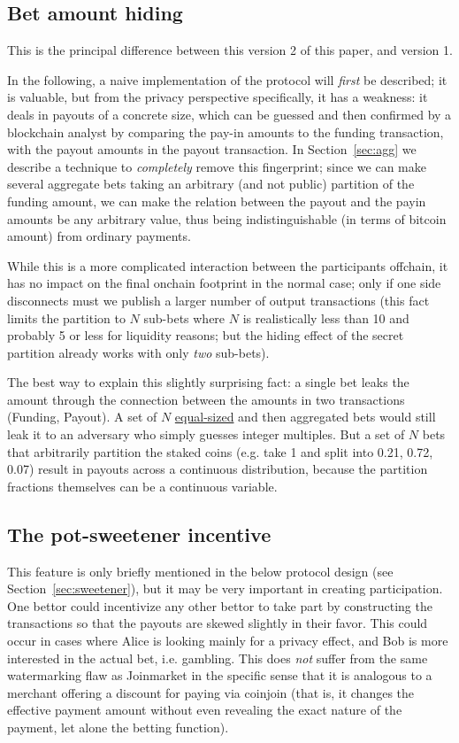 \documentclass[11pt]{article}
\begin{document}
\subsection{Bet amount hiding}
\label{sec:bamhide}

This is the principal difference between this version 2 of this paper, and version 1.

In the following, a naive implementation of the protocol will \emph{first} be described; it is valuable, but from the privacy perspective specifically, it has a weakness: it deals in payouts of a concrete size, which can be guessed and then confirmed by a blockchain analyst by comparing the pay-in amounts to the funding transaction, with the payout amounts in the payout transaction. In Section~\ref{sec:agg} we describe a technique to \emph{completely} remove this fingerprint; since we can make several aggregate bets taking an arbitrary (and not public) partition of the funding amount, we can make the relation between the payout and the payin amounts be any arbitrary value, thus being indistinguishable (in terms of bitcoin amount) from ordinary payments.

While this is a more complicated interaction between the participants offchain, it has no impact on the final onchain footprint in the normal case; only if one side disconnects must we publish a larger number of output transactions (this fact limits the partition to $N$ sub-bets where $N$ is realistically less than 10 and probably 5 or less for liquidity reasons; but the hiding effect of the secret partition already works with only \emph{two} sub-bets).

The best way to explain this slightly surprising fact: a single bet leaks the amount through the connection between the amounts in two transactions (Funding, Payout). A set of $N$ \underline{equal-sized} and then aggregated bets would still leak it to an adversary who simply guesses integer multiples. But a set of $N$ bets that arbitrarily partition the staked coins (e.g. take 1 and split into 0.21, 0.72, 0.07) result in payouts across a continuous distribution, because the partition fractions themselves can be a continuous variable.

\subsection{The pot-sweetener incentive}
\label{sec:potsweet}

This feature is only briefly mentioned in the below protocol design (see Section~\ref{sec:sweetener}), but it may be very important in creating participation. One bettor could incentivize any other bettor to take part by constructing the transactions so that the payouts are skewed slightly in their favor. This could occur in cases where Alice is looking mainly for a privacy effect, and Bob is more interested in the actual bet, i.e. gambling. This does \emph{not} suffer from the same watermarking flaw as Joinmarket \cite{joinmarket} in the specific sense that it is analogous to a merchant offering a discount for paying via coinjoin (that is, it changes the effective payment amount without even revealing the exact nature of the payment, let alone the betting function).
\end{document}
